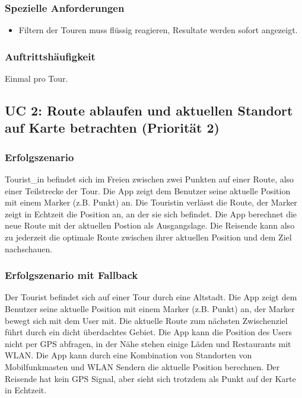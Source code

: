\documentclass[a4paper,10pt,xetex]{article}
\begin{document}
\subsubsection{Spezielle Anforderungen}\label{spezielle-anforderungen}
\begin{itemize}
  \item Filtern der Touren muss flüssig reagieren, Resultate werden sofort angezeigt.
\end{itemize}


\subsubsection{Auftrittshäufigkeit}\label{auftrittshuxe4ufigkeit}
Einmal pro Tour.


\subsection{UC 2: Route ablaufen und aktuellen Standort auf Karte betrachten (Priorität 2)}\label{uc-2-user-luxe4uft-route-ab-und-sieht-seine-aktuellen-standort-auf-einer-karte-priorituxe4t-2}
\subsubsection{Erfolgszenario}\label{erfolgszenario}
Tourist_in befindet sich im Freien zwischen zwei Punkten auf einer
Route, also einer Teilstrecke der Tour. Die App zeigt dem Benutzer seine
aktuelle Position mit einem Marker (z.B. Punkt) an. Die Touristin verlässt
die Route, der Marker zeigt in Echtzeit die Position an, an der sie sich
befindet. Die App berechnet die neue Route mit der aktuellen Postion als
Ausgangslage. Die Reisende kann also zu jederzeit die optimale Route
zwischen ihrer aktuellen Position und dem Ziel nachschauen.


\subsubsection{Erfolgszenario mit Fallback}\label{erfolgszenario-mit-fallback}
Der Tourist befindet sich auf einer Tour durch eine Altstadt. Die App
zeigt dem Benutzer seine aktuelle Position mit einem Marker (z.B. Punkt)
an, der Marker bewegt sich mit dem User mit. Die aktuelle Route zum
nächsten Zwischenziel führt durch ein dicht überdachtes Gebiet. Die App
kann die Position des Users nicht per GPS abfragen, in der Nähe stehen
einige Läden und Restaurants mit WLAN. Die App kann durch eine
Kombination von Standorten von Mobilfunkmasten und WLAN Sendern die
aktuelle Position berechnen. Der Reisende hat kein GPS Signal, aber
sieht sich trotzdem als Punkt auf der Karte in Echtzeit.
\end{document}
